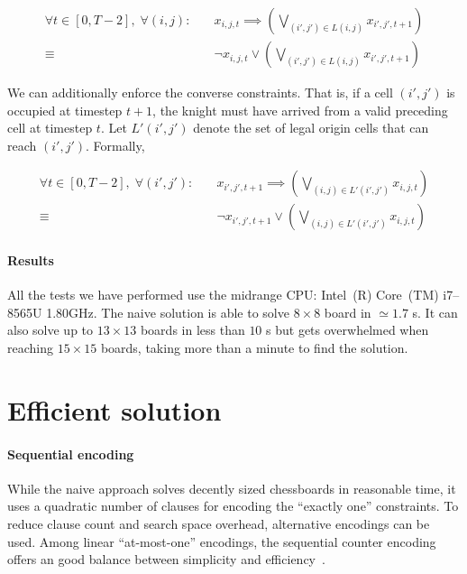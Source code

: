 \documentclass[a4paper, 11pt]{article}
\begin{document}
\begin{equation}
    \begin{aligned}
    \forall t \in [0, T-2], \; \forall (i, j) : \quad & x_{i,j,t} \implies \left( \bigvee_{(i', j') \in L(i,j)} x_{i',j',t+1} \right) \\
    \equiv \quad & \neg x_{i,j,t} \vee \left( \bigvee_{(i', j') \in L(i,j)} x_{i',j',t+1} \right)
    \end{aligned}
\end{equation}

We can additionally enforce the converse constraints. That is, if a cell $(i', j')$ is occupied at timestep $t+1$, the knight must have arrived from a valid preceding cell at timestep $t$. Let $L'(i', j')$ denote the set of legal origin cells that can reach $(i', j')$. Formally, 

\begin{equation}
    \begin{aligned}
    \forall t \in [0, T-2], \; \forall (i', j') : \quad & x_{i',j',t+1} \implies \left( \bigvee_{(i, j) \in L'(i',j')} x_{i,j,t} \right) \\
    \equiv \quad & \neg x_{i',j',t+1} \vee \left( \bigvee_{(i, j) \in L'(i',j')} x_{i,j,t} \right)
    \end{aligned}
\end{equation}

\paragraph{Results}
All the tests we have performed use the midrange CPU: Intel~(R) Core~(TM) i7--8565U 1.80GHz. The naive solution is able to solve $8 \times 8$ board in $\simeq 1.7$ s. It can also solve up to $13 \times 13$ boards in less than $10$ s but gets overwhelmed when reaching $15 \times 15$ boards, taking more than a minute to find the solution.

\section{Efficient solution}
\paragraph{Sequential encoding}
While the naive approach solves decently sized chessboards in reasonable time, it uses a quadratic number of clauses for encoding the ``exactly one'' constraints.
To reduce clause count and search space overhead, alternative encodings can be used. Among linear ``at-most-one'' encodings, the sequential counter encoding offers an good balance between simplicity and efficiency~\cite{holldobler2013efficient}.
\end{document}
